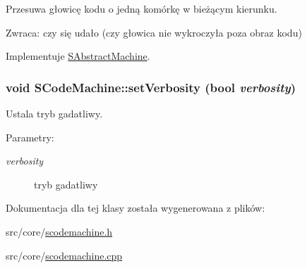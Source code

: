 Przesuwa głowicę kodu o jedną komórkę w bieżącym kierunku. \begin{Desc}
\item[Zwraca:]czy się udało (czy głowica nie wykroczyła poza obraz kodu) \end{Desc}


Implementuje \hyperlink{classSAbstractMachine_72a47b72416e0d2f24fcf36415d37404}{SAbstractMachine}.\hypertarget{classSCodeMachine_4a2d7edca4db9e3bd8942abc13f6c8ec}{
\subsubsection[{setVerbosity}]{\setlength{\rightskip}{0pt plus 5cm}void SCodeMachine::setVerbosity (bool {\em verbosity})}}
\label{classSCodeMachine_4a2d7edca4db9e3bd8942abc13f6c8ec}


Ustala tryb gadatliwy. \begin{Desc}
\item[Parametry:]
\begin{description}
\item[{\em verbosity}]tryb gadatliwy \end{description}
\end{Desc}


Dokumentacja dla tej klasy została wygenerowana z plików:\begin{CompactItemize}
\item 
src/core/\hyperlink{scodemachine_8h}{scodemachine.h}\item 
src/core/\hyperlink{scodemachine_8cpp}{scodemachine.cpp}\end{CompactItemize}
